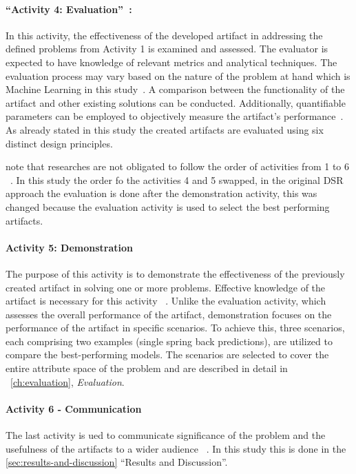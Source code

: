\paragraph{``Activity 4: Evaluation''~\cite[p. 56]{peffers_designscienceresearch_2007}:}
In this activity, the effectiveness of the developed artifact in addressing the defined problems from Activity 1 is
examined and assessed.
The evaluator is expected to have knowledge of relevant metrics and analytical techniques.
The evaluation process may vary based on the nature of the problem at hand which is Machine Learning in this
study~\cite[p. 56]{peffers_designscienceresearch_2007}.
A comparison between the functionality of the artifact and other existing solutions can be conducted.
Additionally, quantifiable parameters can be employed to objectively measure the artifact's
performance~\cite[p. 56]{peffers_designscienceresearch_2007}.
As already stated in this study the created artifacts are evaluated using six distinct design principles.

\cite{peffers_designscienceresearch_2007} note that researches are not obligated to follow the order of activities
from 1 to 6
~\cite[p. 56]{peffers_designscienceresearch_2007}.
In this study the order fo the activities 4 and 5 swapped, in the original DSR approach the evaluation is done after
the demonstration activity, this was changed because the evaluation activity is used to select the best performing
artifacts.

\paragraph{Activity 5: Demonstration}
The purpose of this activity is to demonstrate the effectiveness of the previously created artifact in solving one or
more problems.
Effective knowledge of the artifact is necessary for this activity
~\cite[p. 55]{peffers_designscienceresearch_2007}.
Unlike the evaluation activity, which assesses the overall performance of the artifact, demonstration focuses on the
performance of the artifact in specific scenarios.
To achieve this, three scenarios, each comprising two examples (single spring back predictions), are utilized to
compare the best-performing models.
The scenarios are selected to cover the entire attribute space of the problem and are described in detail in
~\cref{ch:evaluation}, \textit{Evaluation}.

\paragraph{Activity 6 - Communication}
The last activity is ued to communicate significance of the problem and the usefulness of the artifacts to a wider
audience
~\cite[p. 56]{peffers_designscienceresearch_2007}.
In this study this is done in the \cref{sec:results-and-discussion} ``Results and Discussion''.


